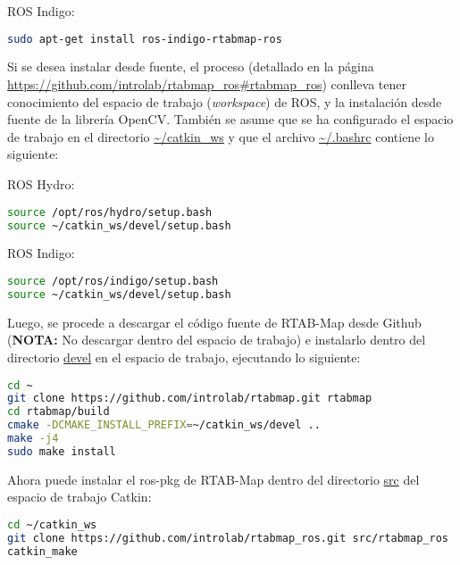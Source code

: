\noindent ROS Indigo:
\begin{blackcodebox}
\begin{lstlisting}[language=bash]
sudo apt-get install ros-indigo-rtabmap-ros
\end{lstlisting}
\end{blackcodebox}

Si se desea instalar desde fuente, el proceso (detallado en la página \url{https://github.com/introlab/rtabmap_ros#rtabmap_ros}) conlleva tener conocimiento del espacio de trabajo (\textit{workspace}) de ROS, y la instalación desde fuente de la librería OpenCV. También se asume que se ha configurado el espacio de trabajo en el directorio \url{~/catkin_ws} y que el archivo \url{~/.bashrc} contiene lo siguiente:

\noindent ROS Hydro:
\begin{blackcodebox}
\begin{lstlisting}[language=bash]
source /opt/ros/hydro/setup.bash
source ~/catkin_ws/devel/setup.bash
\end{lstlisting}
\end{blackcodebox}

\noindent ROS Indigo:
\begin{blackcodebox}
\begin{lstlisting}[language=bash]
source /opt/ros/indigo/setup.bash
source ~/catkin_ws/devel/setup.bash
\end{lstlisting}
\end{blackcodebox}

Luego, se procede a descargar el código fuente de RTAB-Map desde Github (\textbf{NOTA:} No descargar dentro del espacio de trabajo) e instalarlo dentro del directorio \url{devel} en el espacio de trabajo, ejecutando lo siguiente:
\begin{blackcodebox}
\begin{lstlisting}[language=bash]
cd ~
git clone https://github.com/introlab/rtabmap.git rtabmap
cd rtabmap/build
cmake -DCMAKE_INSTALL_PREFIX=~/catkin_ws/devel ..
make -j4
sudo make install
\end{lstlisting}
\end{blackcodebox}

Ahora puede instalar el ros-pkg de RTAB-Map dentro del directorio \url{src} del espacio de trabajo Catkin:
\begin{blackcodebox}
\begin{lstlisting}[language=bash]
cd ~/catkin_ws
git clone https://github.com/introlab/rtabmap_ros.git src/rtabmap_ros
catkin_make
\end{lstlisting}
\end{blackcodebox}

